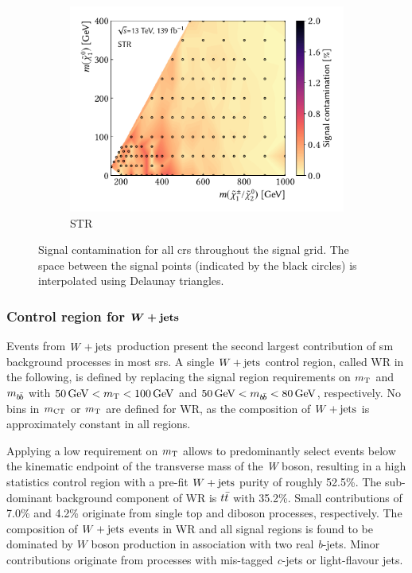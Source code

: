 \begin{figure}
\begin{subfigure}[b]{0.5\linewidth}
		\centering\includegraphics[width=1.0\textwidth]{signal_contamination/plot_STR}
		\caption{STR\label{fig:signal_contaminations_STCR}}
	\end{subfigure}\hfill

	\caption{Signal contamination for all \glspl{cr} throughout the signal grid. The space between the signal points (indicated by the black circles) is interpolated using Delaunay triangles.}
	\label{fig:signal_contamination_CR}
\end{figure}

\subsubsection[Control region for $\wjets$]{Control region for $\makemebold{\wjets}$}

Events from $\wjets$ production present the second largest contribution of \gls{sm} background processes in most \glspl{sr}.
A single $\wjets$ control region, called WR in the following, is defined by replacing the signal region requirements on $m_{\textrm{T}}$ and $m_{b\hspace{-0.06em}\bar{b}}$ with $\SI{50}{\GeV} < \mt < \SI{100}{\GeV}$  and $\SI{50}{\GeV} < \mbb < \SI{80}{\GeV}$, respectively.
No bins in $m_{\textrm{CT}}$ or $m_{\textrm{T}}$ are defined for WR, as the composition of $\wjets$ is approximately constant in all regions.

Applying a low requirement on $m_{\textrm{T}}$ allows to predominantly select events below the kinematic endpoint of the transverse mass of the \textit{W} boson, resulting in a high statistics control region with a pre-fit $\wjets$ purity of roughly 52.5\%.
The sub-dominant background component of WR is $t\bar{t}$ with 35.2\%.
Small contributions of 7.0\% and 4.2\% originate from single top and diboson processes, respectively.
The composition of $\wjets$ events in WR and all signal regions is found to be dominated by $W$ boson production in association with two real \textit{b}-jets.
Minor contributions originate from processes with mis-tagged \textit{c}-jets or light-flavour jets.

